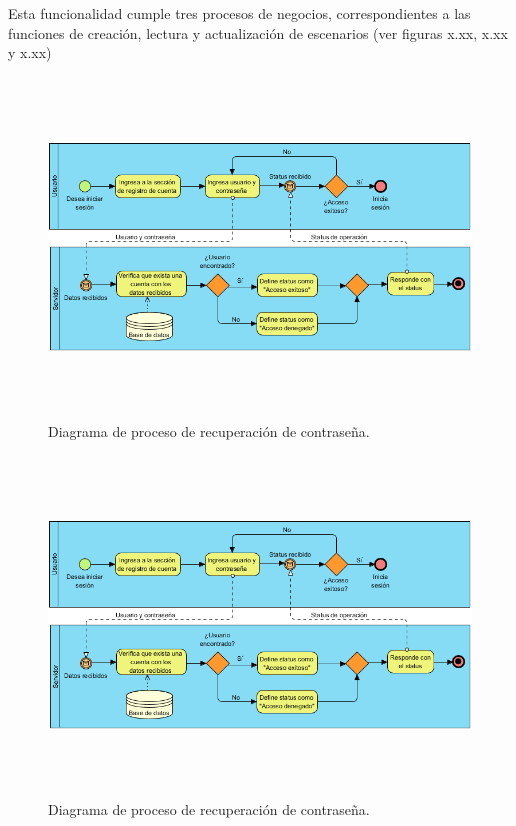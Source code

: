Esta funcionalidad cumple tres procesos de negocios, correspondientes a las funciones de creación, lectura y actualización de escenarios (ver figuras x.xx, x.xx y x.xx)

\begin{figure}[h!]
	\centering
	\includegraphics[width=15cm,height=9cm]{imagenes/desarrollo/diagramas/BPMN_LOGIN.png}
	\caption{Diagrama de proceso de recuperación de contraseña.}
	\label{fig:recover}
\end{figure}
\begin{figure}[h!]
	\centering
	\includegraphics[width=15cm,height=9cm]{imagenes/desarrollo/diagramas/BPMN_LOGIN.png}
	\caption{Diagrama de proceso de recuperación de contraseña.}
	\label{fig:recover}
\end{figure}
